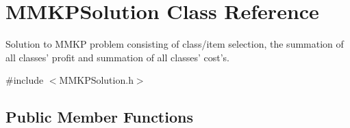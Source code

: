 \hypertarget{class_m_m_k_p_solution}{\section{M\+M\+K\+P\+Solution Class Reference}
\label{class_m_m_k_p_solution}
}


Solution to M\+M\+K\+P problem consisting of class/item selection, the summation of all classes' profit and summation of all classes' cost's.  




{\ttfamily \#include $<$M\+M\+K\+P\+Solution.\+h$>$}

\subsection*{Public Member Functions}
